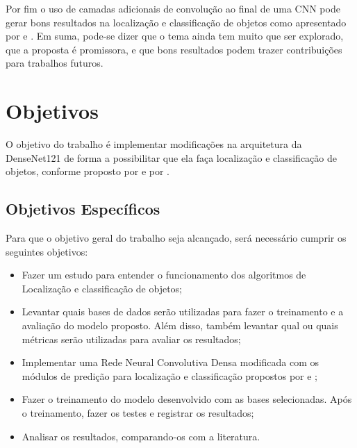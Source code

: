 Por fim o uso de camadas adicionais de convolução ao final de uma \ac{CNN} pode gerar bons resultados na localização e classificação de objetos como apresentado por  e . Em suma, pode-se dizer que o tema ainda tem muito que ser explorado, que a proposta é promissora, e que bons resultados podem trazer contribuições para trabalhos futuros.


\section{Objetivos}
\label{secao:1:2}  

O objetivo do trabalho é implementar modificações na arquitetura da \ac{DenseNet}121 de forma a possibilitar que ela faça localização e classificação de objetos, conforme proposto por  e por .

\subsection{Objetivos Específicos}

Para que o objetivo geral do trabalho seja alcançado, será necessário cumprir os seguintes objetivos:

\begin{itemize}
	\item Fazer um estudo para entender o funcionamento dos algoritmos de Localização e classificação de objetos;
	\item Levantar quais bases de dados serão utilizadas para fazer o treinamento e a avaliação do modelo proposto. Além disso, também levantar qual ou quais métricas serão utilizadas para avaliar os resultados;
	\item Implementar uma Rede Neural Convolutiva Densa modificada com os módulos de predição para localização e classificação propostos por  e ;
	\item Fazer o treinamento do modelo desenvolvido com as bases selecionadas. Após o treinamento, fazer os testes e registrar os resultados;
	\item Analisar os resultados, comparando-os com a literatura.
\end{itemize}

